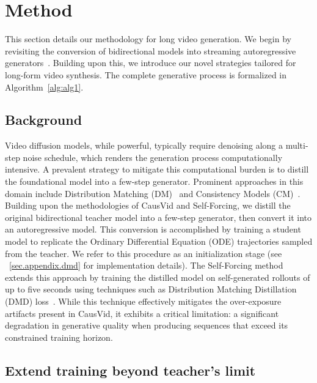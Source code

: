 \section{Method}
This section details our methodology for long video generation. We begin by revisiting the conversion of bidirectional models into streaming autoregressive generators~\citep{yin2025causvid,huang2025self}. Building upon this, we introduce our novel strategies tailored for long-form video synthesis. The complete generative process is formalized in Algorithm~\ref{alg:alg1}.



\subsection{Background}
Video diffusion models, while powerful, typically require denoising along a multi-step noise schedule, which renders the generation process computationally intensive. A prevalent strategy to mitigate this computational burden is to distill the foundational model into a few-step generator. Prominent approaches in this domain include Distribution Matching (DM)~\citep{yin2024one,yin2024improved,luo2025learning} and Consistency Models (CM)~\citep{song2023consistency,wang2024phased}.
Building upon the methodologies of CausVid and Self-Forcing, we distill the original bidirectional teacher model into a few-step generator, then convert it into an autoregressive model. 
This conversion is accomplished by training a student model to replicate the Ordinary Differential Equation (ODE) trajectories sampled from the teacher. We refer to this procedure as an initialization stage (see ~\cref{sec.appendix.dmd} for implementation details).
The Self-Forcing method extends this approach by training the distilled model on self-generated rollouts of up to five seconds using techniques such as Distribution Matching Distillation (DMD) loss~\citep{yin2024improved}. While this technique effectively mitigates the over-exposure artifacts present in CausVid, it exhibits a critical limitation: a significant degradation in generative quality when producing sequences that exceed its constrained training horizon.


\subsection{Extend training beyond teacher's limit}
\label{sec.extended_dmd}


